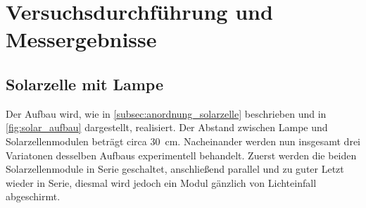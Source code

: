 \documentclass[english, ngerman]{scrartcl}
\begin{document}
\newpage
\section{Versuchsdurchführung und Messergebnisse}
\label{sec:versuchsdurchfuehrung_messergebnisse}

\subsection{Solarzelle mit Lampe}
\label{subsec:durchfuehrung_solar_lampe}
Der Aufbau wird, wie in \autoref{subsec:anordnung_solarzelle} beschrieben und in \autoref{fig:solar_aufbau} dargestellt, realisiert. Der Abstand zwischen Lampe und Solarzellenmodulen beträgt circa \SI{30}{cm}. Nacheinander werden nun insgesamt drei Variatonen desselben Aufbaus experimentell behandelt. Zuerst werden die beiden Solarzellenmodule in Serie geschaltet, anschließend parallel und zu guter Letzt wieder in Serie, diesmal wird jedoch ein Modul gänzlich von Lichteinfall abgeschirmt.
\end{document}
